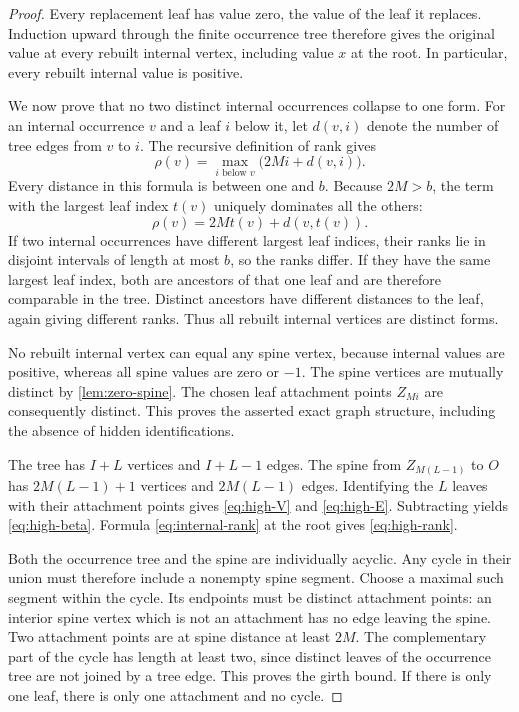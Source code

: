 \documentclass[11pt,a4paper]{article}
\numberwithin{equation}{section}
\theoremstyle{definition}
\theoremstyle{remark}
\newcommand{\rk}{\rho}
\begin{document}
\begin{proof}
Every replacement leaf has value zero, the value of the leaf it replaces.
Induction upward through the finite occurrence tree therefore gives the
original value at every rebuilt internal vertex, including value $x$ at the
root. In particular, every rebuilt internal value is positive.

We now prove that no two distinct internal occurrences collapse to one form.
For an internal occurrence $v$ and a leaf $i$ below it, let $d(v,i)$ denote the
number of tree edges from $v$ to $i$. The recursive definition of rank gives
\begin{equation}
\label{eq:internal-rank}
 \rk(v)=\max_{i\text{ below }v}\bigl(2Mi+d(v,i)\bigr).
\end{equation}
Every distance in this formula is between one and $b$. Because $2M>b$, the
term with the largest leaf index $t(v)$ uniquely dominates all the others:
\begin{equation}
 \rk(v)=2Mt(v)+d(v,t(v)).
\end{equation}
If two internal occurrences have different largest leaf indices, their ranks
lie in disjoint intervals of length at most $b$, so the ranks differ. If they
have the same largest leaf index, both are ancestors of that one leaf and are
therefore comparable in the tree. Distinct ancestors have different distances
to the leaf, again giving different ranks. Thus all rebuilt internal vertices
are distinct forms.

No rebuilt internal vertex can equal any spine vertex, because internal values
are positive, whereas all spine values are zero or $-1$. The spine vertices
are mutually distinct by \cref{lem:zero-spine}. The chosen leaf attachment
points $Z_{Mi}$ are consequently distinct. This proves the asserted exact graph
structure, including the absence of hidden identifications.

The tree has $I+L$ vertices and $I+L-1$ edges. The spine from $Z_{M(L-1)}$ to
$O$ has $2M(L-1)+1$ vertices and $2M(L-1)$ edges. Identifying the $L$ leaves
with their attachment points gives \eqref{eq:high-V} and \eqref{eq:high-E}.
Subtracting yields \eqref{eq:high-beta}. Formula \eqref{eq:internal-rank} at
the root gives \eqref{eq:high-rank}.

Both the occurrence tree and the spine are individually acyclic. Any cycle in
their union must therefore include a nonempty spine segment. Choose a maximal
such segment within the cycle. Its endpoints must be distinct attachment
points: an interior spine vertex which is not an attachment has no edge leaving
the spine. Two attachment points are at spine distance at least $2M$. The
complementary part of the cycle has length at least two, since distinct leaves
of the occurrence tree are not joined by a tree edge. This proves the girth
bound. If there is only one leaf, there is only one attachment and no cycle.


\end{proof}
\end{document}
